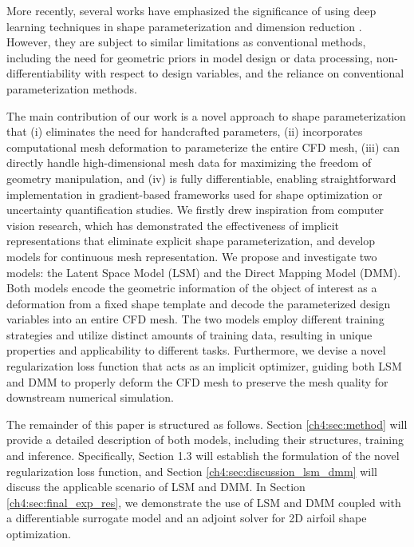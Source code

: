 More recently, several works have emphasized the significance of using deep learning techniques in shape parameterization \cite{aa.Li2020, aa.Li2021,aa.Li2022d} and dimension reduction \cite{aa.Glaws2022}. However, they are subject to similar limitations as conventional methods, including the need for geometric priors in model design or data processing, non-differentiability with respect to design variables, and the reliance on conventional parameterization methods.

The main contribution of our work is a novel approach to shape parameterization that (i) eliminates the need for handcrafted parameters, (ii) incorporates computational mesh deformation to parameterize the entire CFD mesh, (iii) can directly handle high-dimensional mesh data for maximizing the freedom of geometry manipulation, and (iv) is fully differentiable, enabling straightforward implementation in gradient-based frameworks used for shape optimization or uncertainty quantification studies. We firstly drew inspiration from computer vision research, which has demonstrated the effectiveness of implicit representations \cite{ai.Park2019c} that eliminate explicit shape parameterization, and develop models for continuous mesh representation. We propose and investigate two models: the Latent Space Model (LSM) and the Direct Mapping Model (DMM). Both models encode the geometric information of the object of interest as a deformation from a fixed shape template and decode the parameterized design variables into an entire CFD mesh. The two models employ different training strategies and utilize distinct amounts of training data, resulting in unique properties and applicability to different tasks. Furthermore, we devise a novel regularization loss function that acts as an implicit optimizer, guiding both LSM and DMM to properly deform the CFD mesh to preserve the mesh quality for downstream numerical simulation.

The remainder of this paper is structured as follows. Section \ref{ch4:sec:method} will provide a detailed description of both models, including their structures, training and inference. Specifically, Section 1.3 will establish the formulation of the novel regularization loss function, and Section \ref{ch4:sec:discussion_lsm_dmm} will discuss the applicable scenario of LSM and DMM. In Section \ref{ch4:sec:final_exp_res}, we demonstrate the use of LSM and DMM coupled with a differentiable surrogate model and an adjoint solver for 2D airfoil shape optimization.
